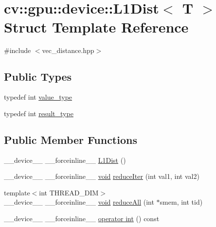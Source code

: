 \hypertarget{structcv_1_1gpu_1_1device_1_1L1Dist}{\section{cv\-:\-:gpu\-:\-:device\-:\-:L1\-Dist$<$ T $>$ Struct Template Reference}
\label{structcv_1_1gpu_1_1device_1_1L1Dist}
}


{\ttfamily \#include $<$vec\-\_\-distance.\-hpp$>$}

\subsection*{Public Types}
\begin{DoxyCompactItemize}
\item 
typedef int \hyperlink{structcv_1_1gpu_1_1device_1_1L1Dist_a73da9e9f3e581fa8c905f126cbad58bd}{value\-\_\-type}
\item 
typedef int \hyperlink{structcv_1_1gpu_1_1device_1_1L1Dist_a7e30b00eb05c3d17cad6f588e55917fa}{result\-\_\-type}
\end{DoxyCompactItemize}
\subsection*{Public Member Functions}
\begin{DoxyCompactItemize}
\item 
\-\_\-\-\_\-device\-\_\-\-\_\- \-\_\-\-\_\-forceinline\-\_\-\-\_\- \hyperlink{structcv_1_1gpu_1_1device_1_1L1Dist_ae90ded0b9f07b279ba7754078de845a7}{L1\-Dist} ()
\item 
\-\_\-\-\_\-device\-\_\-\-\_\- \-\_\-\-\_\-forceinline\-\_\-\-\_\- \hyperlink{legacy_8hpp_a8bb47f092d473522721002c86c13b94e}{void} \hyperlink{structcv_1_1gpu_1_1device_1_1L1Dist_a512eaa84d547ff7c013af605bc6fa833}{reduce\-Iter} (int val1, int val2)
\item 
{\footnotesize template$<$int T\-H\-R\-E\-A\-D\-\_\-\-D\-I\-M$>$ }\\\-\_\-\-\_\-device\-\_\-\-\_\- \-\_\-\-\_\-forceinline\-\_\-\-\_\- \hyperlink{legacy_8hpp_a8bb47f092d473522721002c86c13b94e}{void} \hyperlink{structcv_1_1gpu_1_1device_1_1L1Dist_a5c5579b19fd8ee3ab99e911080b74d92}{reduce\-All} (int $\ast$smem, int tid)
\item 
\-\_\-\-\_\-device\-\_\-\-\_\- \-\_\-\-\_\-forceinline\-\_\-\-\_\- \hyperlink{structcv_1_1gpu_1_1device_1_1L1Dist_a79dea9437dbb83b73585c6b02752177d}{operator int} () const 
\end{DoxyCompactItemize}
